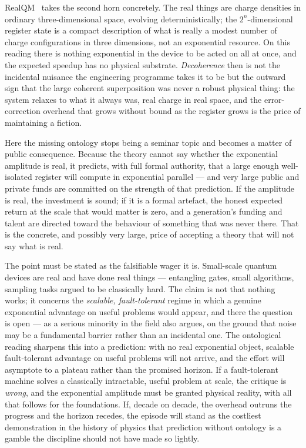 \documentclass[11pt]{article}
\begin{document}
RealQM~\cite{RealQM} takes the second horn concretely. The real things are charge densities in ordinary three-dimensional
space, evolving deterministically; the $2^n$-dimensional register state is a compact description of what is
really a modest number of charge configurations in three dimensions, not an exponential resource. On this reading
there is nothing exponential in the device to be acted on all at once, and the expected speedup has no physical
substrate. \emph{Decoherence} then is not the incidental nuisance the engineering programme takes it to be but the
outward sign that the large coherent superposition was never a robust physical thing: the system relaxes to what
it always was, real charge in real space, and the error-correction overhead that grows without bound as the
register grows is the price of maintaining a fiction.

Here the missing ontology stops being a seminar topic and becomes a matter of public consequence. Because the
theory cannot say whether the exponential amplitude is real, it predicts, with full formal authority, that a
large enough well-isolated register will compute in exponential parallel --- and very large public and private
funds are committed on the strength of that prediction. If the amplitude is real, the investment is sound; if it
is a formal artefact, the honest expected return at the scale that would matter is zero, and a generation's
funding and talent are directed toward the behaviour of something that was never there. That is the concrete, and
possibly very large, price of accepting a theory that will not say what is real.

The point must be stated as the falsifiable wager it is. Small-scale quantum devices are real and have done real
things --- entangling gates, small algorithms, sampling tasks argued to be classically hard. The claim is not
that nothing works; it concerns the \emph{scalable, fault-tolerant} regime in which a genuine exponential
advantage on useful problems would appear, and there the question is open --- as a serious minority in the field
also argues, on the ground that noise may be a fundamental barrier rather than an incidental one. The ontological
reading sharpens this into a prediction: with no real exponential object, scalable fault-tolerant advantage on
useful problems will not arrive, and the effort will asymptote to a plateau rather than the promised horizon. If a
fault-tolerant machine solves a classically intractable, useful problem at scale, the critique is \emph{wrong},
and the exponential amplitude must be granted physical reality, with all that follows for the foundations. If,
decade on decade, the overhead outruns the progress and the horizon recedes, the episode will stand as the
costliest demonstration in the history of physics that prediction without ontology is a gamble the discipline
should not have made so lightly.
\end{document}
